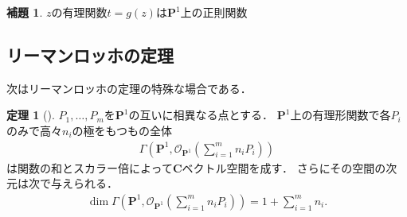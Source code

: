 \documentclass[11pt, a4paper, dvipdfmx, draft]{jsarticle}
\theoremstyle{definition}
\newtheorem{Theorem}[Axiom]{定理}
\newtheorem{Lemma}[Axiom]{補題}
\newcommand{\cc}{\mathbf{C}}
\newcommand{\pp}{\mathbf{P}}
\newcommand{\mcal}{\mathcal}
\newcommand{\OO}{\mcal{O}}
\theoremstyle{mystyle}
\numberwithin{equation}{section} %
\begin{document}
\begin{Lemma}
    $z$の有理関数$t=g(z)$は$\pp^1$上の正則関数    
\end{Lemma}

\subsection{リーマンロッホの定理}

次はリーマンロッホの定理の特殊な場合である．

\begin{Theorem}[{\cite[命題1.14]{ogs}}]
    $P_{1},\dots,P_{m}$を$\pp^{1}$の互いに相異なる点とする．
    $\pp^{1}$上の有理形関数で各$P_i$のみで高々$n_i$の極をもつもの全体
    \begin{align*}
        \Gamma\left(\pp^{1}, \OO_{\pp^{1}}\left(\sum_{i=1}^{m}n_{i}P_{i}\right)\right)
    \end{align*}
    は関数の和とスカラー倍によって$\cc$ベクトル空間を成す．
    さらにその空間の次元は次で与えられる．
    \begin{align*}
        \dim\Gamma\left(
            \pp^{1}, \OO_{\pp^{1}}\left(
                \sum_{i=1}^{m}n_{i}P_{i}
                \right)
            \right)
        = 1+\sum_{i=1}^{m}n_{i}.
    \end{align*}
\end{Theorem}

\newcommand{\rrsp}{\Gamma\left(\pp^{1}, \OO_{\pp^{1}}\left(\sum_{i=1}^{m}n_{i}P_{i}\right)\right)}
\end{document}
